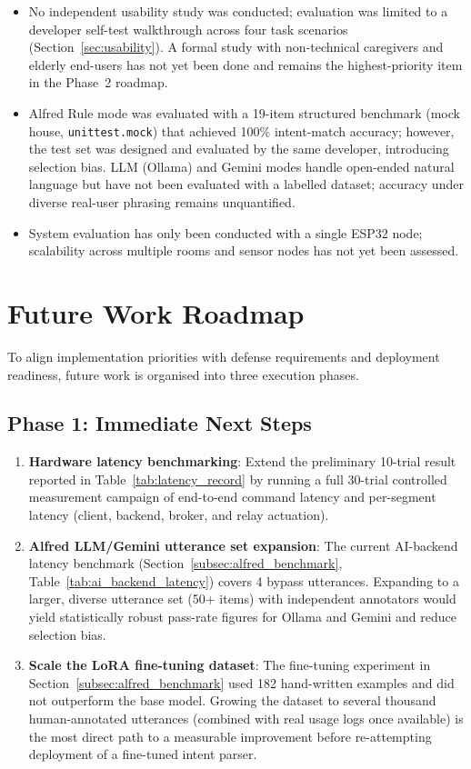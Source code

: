 \begin{itemize}
    \item No independent usability study was conducted; evaluation was limited to a developer self-test walkthrough across four task scenarios (Section~\ref{sec:usability}). A formal study with non-technical caregivers and elderly end-users has not yet been done and remains the highest-priority item in the Phase~2 roadmap.
    
    \item Alfred Rule mode was evaluated with a 19-item structured benchmark (mock house, \texttt{unittest.mock}) that achieved 100\% intent-match accuracy; however, the test set was designed and evaluated by the same developer, introducing selection bias. LLM (Ollama) and Gemini modes handle open-ended natural language but have not been evaluated with a labelled dataset; accuracy under diverse real-user phrasing remains unquantified.

    \item System evaluation has only been conducted with a single ESP32 node; scalability across multiple rooms and sensor nodes has not yet been assessed.

\end{itemize}

\section{Future Work Roadmap}
\label{sec:future}

To align implementation priorities with defense requirements and deployment
readiness, future work is organised into three execution phases.

\subsection*{Phase 1: Immediate Next Steps}
\begin{enumerate}
  \item \textbf{Hardware latency benchmarking}: Extend the preliminary 10-trial result reported in Table~\ref{tab:latency_record} by running a full 30-trial controlled measurement campaign of end-to-end command latency and per-segment latency (client, backend, broker, and relay actuation).

  \item \textbf{Alfred LLM/Gemini utterance set expansion}: The current AI-backend latency benchmark (Section~\ref{subsec:alfred_benchmark}, Table~\ref{tab:ai_backend_latency}) covers 4 bypass utterances. Expanding to a larger, diverse utterance set (50+ items) with independent annotators would yield statistically robust pass-rate figures for Ollama and Gemini and reduce selection bias.

  \item \textbf{Scale the LoRA fine-tuning dataset}: The fine-tuning experiment in Section~\ref{subsec:alfred_benchmark} used 182 hand-written examples and did not outperform the base model. Growing the dataset to several thousand human-annotated utterances (combined with real usage logs once available) is the most direct path to a measurable improvement before re-attempting deployment of a fine-tuned intent parser.
\end{enumerate}

